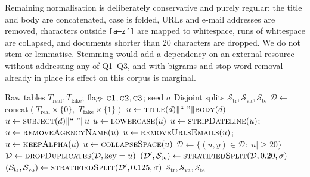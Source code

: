 \documentclass[conference]{IEEEtran}
\begin{document}
Remaining normalisation is deliberately conservative and purely regular: the
title and body are concatenated, case is folded, URLs and e-mail addresses are
removed, characters outside \texttt{[a--z']} are mapped to whitespace, runs of
whitespace are collapsed, and documents shorter than 20 characters are dropped.
We do not stem or lemmatise. Stemming would add a dependency on an external
resource without addressing any of Q1--Q3, and with bigrams and stop-word
removal already in place its effect on this corpus is marginal.

\begin{algorithm}[t]
\caption{Leakage-controlled corpus construction}
\label{alg:corpus}
\begin{algorithmic}[1]
\Require Raw tables $T_{\text{real}}, T_{\text{fake}}$; flags
  $\textsc{c1},\textsc{c2},\textsc{c3}$; seed $\sigma$
\Ensure Disjoint splits $\mathcal{S}_{\text{tr}},\mathcal{S}_{\text{va}},\mathcal{S}_{\text{te}}$
\State $\mathcal{D} \gets$ concat$(T_{\text{real}}\!\times\!\{0\},\;T_{\text{fake}}\!\times\!\{1\})$
  \State $u \gets \textsc{title}(d) \Vert \text{`` ''} \Vert \textsc{body}(d)$
   
    \State $u \gets \textsc{subject}(d) \Vert \text{`` ''} \Vert u$
  \EndIf
  \State $u \gets \textsc{lowercase}(u)$
    \State $u \gets \textsc{stripDateline}(u)$;\;
           $u \gets \textsc{removeAgencyName}(u)$
  \EndIf
  \State $u \gets \textsc{removeUrlsEmails}(u)$;\;
         $u \gets \textsc{keepAlpha}(u)$
  \State $u \gets \textsc{collapseSpace}(u)$
\EndFor
\State $\mathcal{D} \gets \{(u,y) \in \mathcal{D} : |u| \geq 20\}$
  \State $\mathcal{D} \gets \textsc{dropDuplicates}(\mathcal{D}, \text{key}=u)$
\EndIf
\State $(\mathcal{D}', \mathcal{S}_{\text{te}}) \gets
  \textsc{stratifiedSplit}(\mathcal{D}, 0.20, \sigma)$
\State $(\mathcal{S}_{\text{tr}}, \mathcal{S}_{\text{va}}) \gets
  \textsc{stratifiedSplit}(\mathcal{D}', 0.125, \sigma)$
\State \Return $\mathcal{S}_{\text{tr}},\mathcal{S}_{\text{va}},\mathcal{S}_{\text{te}}$
\end{algorithmic}
\end{algorithm}
\end{document}
